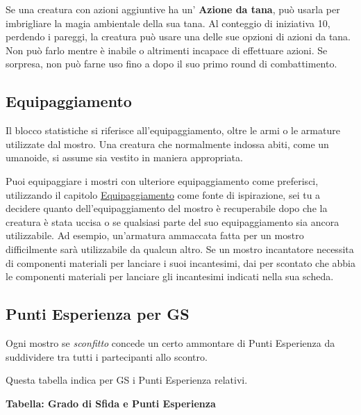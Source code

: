 \begin{multicols}{2}
Se una creatura con azioni aggiuntive ha un' \textbf{Azione da tana}, può usarla per imbrigliare la magia ambientale della sua tana. Al conteggio di iniziativa 10, perdendo i pareggi, la creatura può usare una delle sue opzioni di azioni da tana. Non può farlo mentre è inabile o altrimenti incapace di effettuare azioni. Se sorpresa, non può farne uso fino a dopo il suo primo round di combattimento.




\subsection{Equipaggiamento}

Il blocco statistiche si riferisce all'equipaggiamento, oltre le armi o le armature utilizzate dal mostro. Una creatura che normalmente indossa abiti, come un umanoide, si assume sia vestito in maniera appropriata.

Puoi equipaggiare i mostri con ulteriore equipaggiamento come preferisci, utilizzando il capitolo \hyperlink{equipaggiamento}{Equipaggiamento} come fonte di ispirazione, sei tu a decidere quanto dell'equipaggiamento del mostro è recuperabile dopo che la creatura è stata uccisa o se qualsiasi parte del suo equipaggiamento sia ancora utilizzabile. Ad esempio, un'armatura ammaccata fatta per un mostro difficilmente sarà utilizzabile da qualcun altro. Se un mostro incantatore necessita di componenti materiali per lanciare i suoi incantesimi, dai per scontato che abbia le componenti materiali per lanciare gli incantesimi indicati nella sua scheda.

\subsection{Punti Esperienza per GS}

Ogni mostro se \emph{sconfitto} concede un certo ammontare di Punti Esperienza da suddividere tra tutti i partecipanti allo scontro.

Questa tabella indica per GS i Punti Esperienza relativi.

\medskip

\textbf{Tabella: Grado di Sfida e Punti Esperienza}


\end{multicols}
